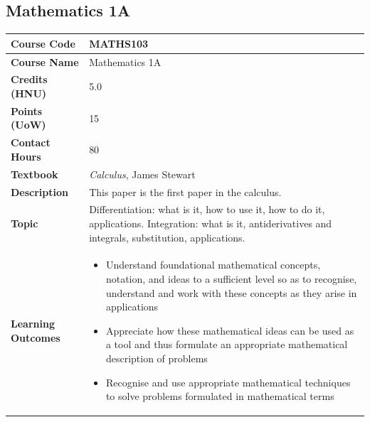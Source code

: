\documentclass{article}
\begin{document}
\subsection[MATHS103 Mathematics 1A]{Mathematics 1A}
\renewcommand{\arraystretch}{1.5} %
\begin{longtable}{|p{3cm}|p{10cm}|}
\hline
\textbf{Course Code} & MATHS103 \\
\hline
\textbf{Course Name} & Mathematics 1A\\
\hline
\textbf{Credits (HNU)} & 5.0 \\
\hline
\textbf{Points (UoW)} & 15 \\
\hline
\textbf{Contact Hours} & 80 \\
\hline
\textbf{Textbook} & \emph{Calculus}, James Stewart\\
\hline
\textbf{Description} & This paper is the first paper in the calculus. \\
\hline
\textbf{Topic} & Differentiation: what is it, how to use it, how to do it, applications. Integration: what is it, antiderivatives and integrals, substitution, applications. \\
\hline
\textbf{Learning Outcomes} & 
    \begin{itemize}
        \item Understand foundational mathematical concepts, notation, and ideas to a sufficient level so as to recognise, understand and work with these concepts as they arise in applications
        \item Appreciate how these mathematical ideas can be used as a tool and thus formulate an appropriate mathematical description of problems
        \item Recognise and use appropriate mathematical techniques to solve problems formulated in mathematical terms
    \end{itemize} \\
\hline
\end{longtable}
\end{document}
